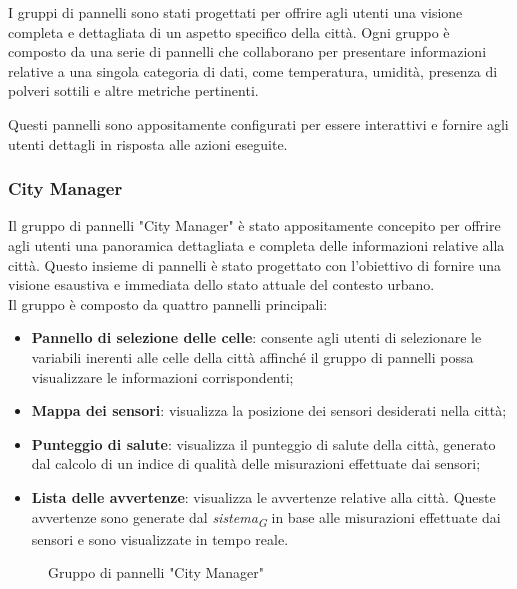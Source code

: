 I gruppi di pannelli sono stati progettati per offrire agli utenti una visione completa e dettagliata di un aspetto specifico della città. Ogni gruppo è composto da una serie di pannelli che collaborano per presentare informazioni relative a una singola categoria di dati, come temperatura, umidità, presenza di polveri sottili e altre metriche pertinenti. 

Questi pannelli sono appositamente configurati per essere interattivi e fornire agli utenti dettagli in risposta alle azioni eseguite.
 \\
\subsubsection{City Manager}
Il gruppo di pannelli "City Manager" è stato appositamente concepito per offrire agli utenti una panoramica dettagliata e completa delle informazioni relative alla città. Questo insieme di pannelli è stato progettato con l'obiettivo di fornire una visione esaustiva e immediata dello stato attuale del contesto urbano. \\
Il gruppo è composto da quattro pannelli principali:
\begin{itemize}
    \item \textbf{Pannello di selezione delle celle}: consente agli utenti di selezionare le variabili inerenti alle celle della città affinché il gruppo di pannelli possa visualizzare le informazioni corrispondenti;
    \item \textbf{Mappa dei sensori}: visualizza la posizione dei sensori desiderati nella città;
    \item \textbf{Punteggio di salute}: visualizza il punteggio di salute della città, generato dal calcolo di un indice di qualità delle misurazioni effettuate dai sensori;
    \item \textbf{Lista delle avvertenze}: visualizza le avvertenze relative alla città. Queste avvertenze sono generate dal \textit{sistema}\textsubscript{\textit{G}} in base alle misurazioni effettuate dai sensori e sono visualizzate in tempo reale.
\end{itemize}
\begin{figure}[H]
    \centering
    \caption{Gruppo di pannelli "City Manager"}
    \label{fig:my_label}
\end{figure}


